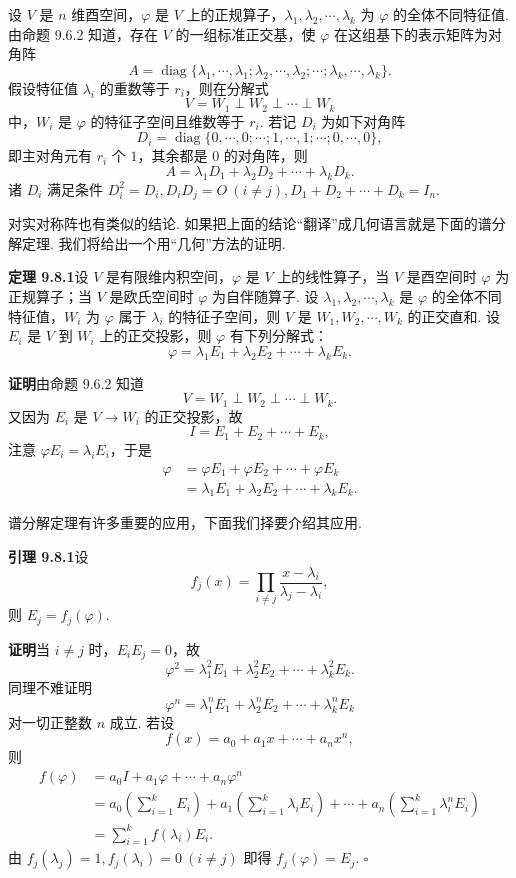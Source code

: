 \documentclass[UTF8,12pt,a4paper,fontset=fandol]{ctexart}
\begin{document}
设 $V$ 是 $n$ 维酉空间，$\varphi$ 是 $V$ 上的正规算子，$\lambda_1,\lambda_2,\cdots,\lambda_k$ 为 $\varphi$ 的全体不同特征值. 由命题 9.6.2 知道，存在 $V$ 的一组标准正交基，使 $\varphi$ 在这组基下的表示矩阵为对角阵
\[
  A=\operatorname{diag}\{\lambda_1,\cdots,\lambda_1;\lambda_2,\cdots,\lambda_2;\cdots;\lambda_k,\cdots,\lambda_k\}.
\]
假设特征值 $\lambda_i$ 的重数等于 $r_i$，则在分解式
\[
  V=W_1\perp W_2\perp\cdots\perp W_k
\]
中，$W_i$ 是 $\varphi$ 的特征子空间且维数等于 $r_i$. 若记 $D_i$ 为如下对角阵
\[
  D_i=\operatorname{diag}\{0,\cdots,0;\cdots;1,\cdots,1;\cdots;0,\cdots,0\},
\]
即主对角元有 $r_i$ 个 $1$，其余都是 $0$ 的对角阵，则
\[
  A=\lambda_1D_1+\lambda_2D_2+\cdots+\lambda_kD_k.
\]
诸 $D_i$ 满足条件 $D_i^2=D_i,D_iD_j=O\ (i\ne j),D_1+D_2+\cdots+D_k=I_n$.

对实对称阵也有类似的结论. 如果把上面的结论“翻译”成几何语言就是下面的谱分解定理. 我们将给出一个用“几何”方法的证明.

\noindent\textbf{定理 9.8.1}\quad 设 $V$ 是有限维内积空间，$\varphi$ 是 $V$ 上的线性算子，当 $V$ 是酉空间时 $\varphi$ 为正规算子；当 $V$ 是欧氏空间时 $\varphi$ 为自伴随算子. 设 $\lambda_1,\lambda_2,\cdots,\lambda_k$ 是 $\varphi$ 的全体不同特征值，$W_i$ 为 $\varphi$ 属于 $\lambda_i$ 的特征子空间，则 $V$ 是 $W_1,W_2,\cdots,W_k$ 的正交直和. 设 $E_i$ 是 $V$ 到 $W_i$ 上的正交投影，则 $\varphi$ 有下列分解式：
\begin{equation}
  \varphi=\lambda_1E_1+\lambda_2E_2+\cdots+\lambda_kE_k.
  \tag{9.8.1}
\end{equation}

\noindent\textbf{证明}\quad 由命题 9.6.2 知道
\[
  V=W_1\perp W_2\perp\cdots\perp W_k.
\]
又因为 $E_i$ 是 $V\to W_i$ 的正交投影，故
\[
  I=E_1+E_2+\cdots+E_k,
\]
注意 $\varphi E_i=\lambda_iE_i$，于是
\[
\begin{aligned}
  \varphi
  &= \varphi E_1+\varphi E_2+\cdots+\varphi E_k\\
  &= \lambda_1E_1+\lambda_2E_2+\cdots+\lambda_kE_k.
\end{aligned}
\]

谱分解定理有许多重要的应用，下面我们择要介绍其应用.

\noindent\textbf{引理 9.8.1}\quad 设
\[
  f_j(x)=\prod_{i\ne j}\frac{x-\lambda_i}{\lambda_j-\lambda_i},
\]
则 $E_j=f_j(\varphi)$.

\noindent\textbf{证明}\quad 当 $i\ne j$ 时，$E_iE_j=0$，故
\[
  \varphi^2=\lambda_1^2E_1+\lambda_2^2E_2+\cdots+\lambda_k^2E_k.
\]
同理不难证明
\[
  \varphi^n=\lambda_1^nE_1+\lambda_2^nE_2+\cdots+\lambda_k^nE_k
\]
对一切正整数 $n$ 成立. 若设
\[
  f(x)=a_0+a_1x+\cdots+a_nx^n,
\]
则
\[
\begin{aligned}
  f(\varphi)
  &= a_0I+a_1\varphi+\cdots+a_n\varphi^n\\
  &= a_0\left(\sum_{i=1}^kE_i\right)
     +a_1\left(\sum_{i=1}^k\lambda_iE_i\right)
     +\cdots
     +a_n\left(\sum_{i=1}^k\lambda_i^nE_i\right)\\
  &= \sum_{i=1}^kf(\lambda_i)E_i.
\end{aligned}
\]
由 $f_j(\lambda_j)=1,f_j(\lambda_i)=0\ (i\ne j)$ 即得 $f_j(\varphi)=E_j$. $\square$
\end{document}
